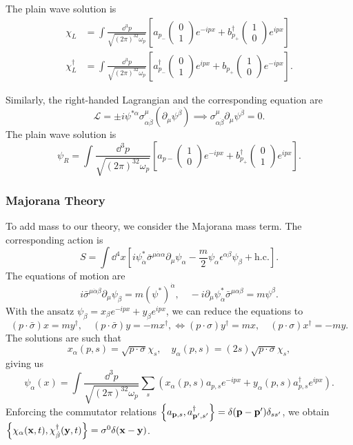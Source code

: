 \documentclass{article}
\begin{document}
The plain wave solution is 
\begin{align*}
    \chi_L&=\int\frac{\dd^3p}{\sqrt{(2\pi)^32\omega_p}}\left[a_{p_-}\begin{pmatrix}0\\1\end{pmatrix}e^{-ipx}+b^\dag_{p_+}\begin{pmatrix}1\\0\end{pmatrix}e^{ipx}\right]\\
    \chi_L^\dag&=\int\frac{\dd^3p}{\sqrt{(2\pi)^32\omega_p}}\left[a^\dag_{p_-}\begin{pmatrix}0\\1\end{pmatrix}e^{ipx}+b_{p_+}\begin{pmatrix}1\\0\end{pmatrix}e^{-ipx}\right].
\end{align*}

Similarly, the right-handed Lagrangian and the corresponding equation are
$$\mathcal L=\pm i\psi^{*\alpha}\sigma^\mu_{\alpha\dot\beta}(\partial_\mu\psi^{\dot\beta})\implies\sigma^\mu_{\alpha\dot\beta}\partial_\mu\psi^{\dot\beta}=0.$$
The plain wave solution is
$$\psi_R=\int\frac{\dd^3p}{\sqrt{(2\pi)^32\omega_p}}\left[a_{p-}\begin{pmatrix}1\\0\end{pmatrix}e^{-ipx}+b^\dag_{p_+}\begin{pmatrix}0\\1\end{pmatrix}e^{ipx}\right].$$


\subsubsection{Majorana Theory}
To add mass to our theory, we consider the Majorana mass term. The corresponding action is 
$$S=\int\dd^4x\left[i\psi^*_{\dot\alpha}\bar\sigma^{\mu\dot\alpha\alpha}\partial_\mu\psi_\alpha-\frac m2\psi_\alpha\epsilon^{\alpha\beta}\psi_\beta+\text{h.c.}\right].$$
The equations of motion are
$$i\bar\sigma^{\mu\dot\alpha\beta}\partial_\mu\psi_\beta=m(\psi^*)^{\dot\alpha},\quad -i\partial_\mu\psi^*_{\dot\alpha}\bar\sigma^{\mu\alpha\beta}=m\psi^\beta.$$
With the ansatz $\psi_\beta=x_\beta e^{-ipx}+y_\beta e^{ipx}$, we can reduce the equations to 
$$(p\cdot\bar\sigma)x=my^\dag,\quad (p\cdot\bar\sigma)y=-mx^\dag,\iff(p\cdot\sigma)y^\dag=mx,\quad(p\cdot\sigma)x^\dag=-my.$$
The solutions are such that 
$$x_\alpha(p,s)=\sqrt{p\cdot\sigma}\chi_s,\quad y_\alpha(p,s)=(2s)\sqrt{p\cdot\sigma}\chi_s,$$
giving us 
$$\psi_\alpha(x)=\int\frac{\dd^3p}{\sqrt{(2\pi)^32\omega_p}}\sum_s\left(x_\alpha(p,s)a_{p,s}e^{-ipx}+y_\alpha(p,s)a^\dag_{p,s}e^{ipx}\right).$$
Enforcing the commutator relations $\acomm{a_{\mathbf p,s}}{a^\dag_{\mathbf p',s'}}=\delta(\mathbf p-\mathbf p')\delta_{ss'}$, we obtain $\acomm{\chi_\alpha(\mathbf x,t)}{\chi^\dag_{\dot\beta}(\mathbf y,t)}=\sigma^0\delta(\mathbf x-\mathbf y)$.
\end{document}
